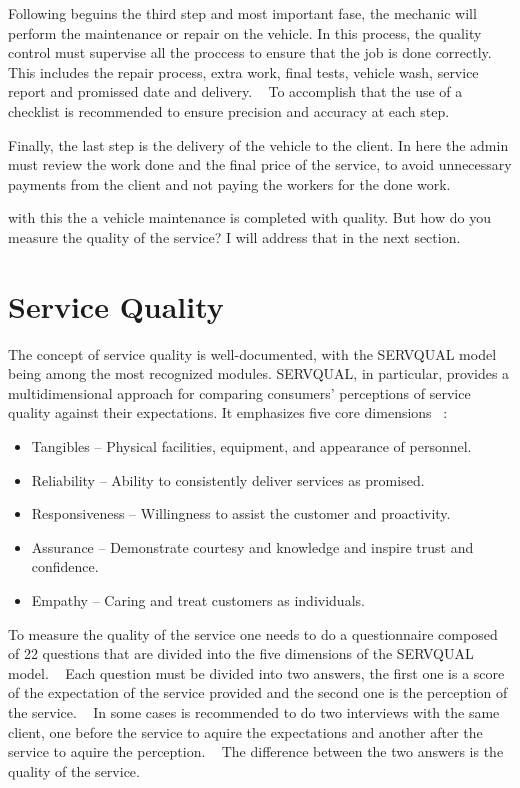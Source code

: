 Following beguins the third step and most important fase, the mechanic will perform the maintenance or repair on the vehicle. 
In this process, the quality control must supervise all the proccess to ensure that the job is done correctly. ~\cite{Setting_the_after_sale_process}
This includes the repair process, extra work, final tests, vehicle wash, service report and promissed date and delivery. ~\cite{Setting_the_after_sale_process}
To accomplish that the use of a checklist is recommended to ensure precision and accuracy at each step. ~\cite{Setting_the_after_sale_process}

Finally, the last step is the delivery of the vehicle to the client. 
In here  the admin must review the work done and the final price of the service, to avoid unnecessary payments from the client and not paying the workers for the done work. ~\cite{Setting_the_after_sale_process}

with this the a vehicle maintenance is completed with quality. 
But how do you measure the quality of the service?
I will address that in the next section.

\section{Service Quality}
The concept of service quality is well-documented, with the SERVQUAL model being among the most recognized modules. 
SERVQUAL, in particular, provides a multidimensional approach for comparing consumers' perceptions of service quality against their expectations. 
It emphasizes five core dimensions ~\cite{SERVQUAL_OLD}:

\begin{itemize}
  \item Tangibles – Physical facilities, equipment, and appearance of personnel.
  \item Reliability – Ability to consistently deliver services as promised.
  \item Responsiveness – Willingness to assist the customer and proactivity.
  \item Assurance – Demonstrate courtesy and knowledge and inspire trust and confidence.
  \item Empathy – Caring and treat customers as individuals.
\end{itemize}

To measure the quality of the service one needs to do a questionnaire composed of 22 questions that are divided into the five dimensions of the SERVQUAL model. ~\cite{Measuring_After_sales_Service_Quality}
Each question must be divided into two answers, the first one is a score of the expectation of the service provided and the second one is the perception of the service. ~\cite{Measuring_After_sales_Service_Quality}
In some cases is recommended to do two interviews with the same client, one before the service to aquire the expectations and another after the service to aquire the perception. ~\cite{servqual_blog_da_qualidade}
The difference between the two answers is the quality of the service. ~\cite{servqual_blog_da_qualidade} ~\cite{Measuring_After_sales_Service_Quality} ~\cite{SERVQUAL_OLD}

